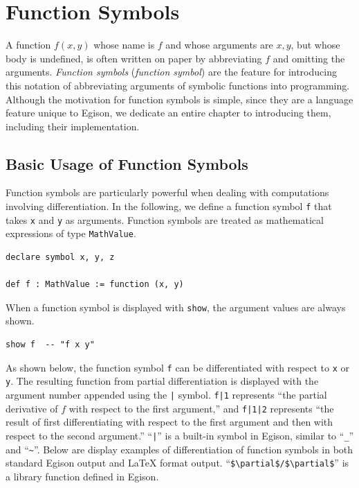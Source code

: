 \chapter{Function Symbols}\label{funcsym}

A function $f(x,y)$ whose name is $f$ and whose arguments are $x,y$, but whose body is undefined, is often written on paper by abbreviating $f$ and omitting the arguments.
\emph{Function symbols} (\emph{function symbol}) are the feature for introducing this notation of abbreviating arguments of symbolic functions into programming.
Although the motivation for function symbols is simple, since they are a language feature unique to Egison, we dedicate an entire chapter to introducing them, including their implementation.

\section{Basic Usage of Function Symbols}\label{funcsym-intro}

Function symbols are particularly powerful when dealing with computations involving differentiation.
In the following, we define a function symbol \lstinline{f} that takes \lstinline{x} and \lstinline{y} as arguments.
Function symbols are treated as mathematical expressions of type \lstinline{MathValue}.

\begin{lstlisting}[language=egison,numbers=none]
declare symbol x, y, z

def f : MathValue := function (x, y)
\end{lstlisting}

When a function symbol is displayed with \lstinline{show}, the argument values are always shown.

\begin{lstlisting}[language=egison,numbers=none]
show f  -- "f x y"
\end{lstlisting}

As shown below, the function symbol \lstinline{f} can be differentiated with respect to \lstinline{x} or \lstinline{y}.
The resulting function from partial differentiation is displayed with the argument number appended using the \verb!|! symbol.
\verb!f|1! represents ``the partial derivative of $f$ with respect to the first argument,'' and \verb!f|1|2! represents ``the result of first differentiating with respect to the first argument and then with respect to the second argument.''
``\verb!|!'' is a built-in symbol in Egison, similar to ``\verb!_!'' and ``\verb!~!''.
Below are display examples of differentiation of function symbols in both standard Egison output and LaTeX format output.
``\lstinline[mathescape]{$\partial$/$\partial$}'' is a library function defined in Egison.

